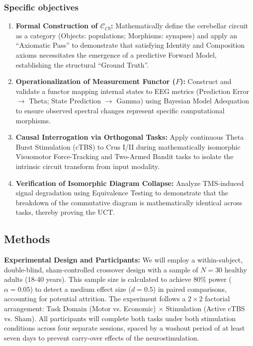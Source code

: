 \documentclass{article}
\begin{document}
	\subsubsection*{Specific objectives}
	\begin{enumerate}
		\item \textbf{Formal Construction of $\mathcal{C}_{Cb}$:} Mathematically define the cerebellar circuit as a category (Objects: populations; Morphisms: synapses) and apply an ``Axiomatic Pass'' to demonstrate that satisfying Identity and Composition axioms necessitates the emergence of a predictive Forward Model, establishing the structural ``Ground Truth''.
		
		\item \textbf{Operationalization of Measurement Functor ($F$):} Construct and validate a functor mapping internal states to EEG metrics (Prediction Error $\to$ Theta; State Prediction $\to$ Gamma) using Bayesian Model Adequation to ensure observed spectral changes represent specific computational morphisms.
		
		\item \textbf{Causal Interrogation via Orthogonal Tasks:} Apply continuous Theta Burst Stimulation (cTBS) to Crus I/II during mathematically isomorphic Visuomotor Force-Tracking and Two-Armed Bandit tasks to isolate the intrinsic circuit transform from input modality.
		
		\item \textbf{Verification of Isomorphic Diagram Collapse:} Analyze TMS-induced signal degradation using Equivalence Testing to demonstrate that the breakdown of the commutative diagram is mathematically identical across tasks, thereby proving the UCT.
	\end{enumerate}
	
	\subsection{Methods}
	
	\textbf{Experimental Design and Participants:} We will employ a within-subject, double-blind, sham-controlled crossover design with a sample of $N=30$ healthy adults (18-40 years). This sample size is calculated to achieve 80\% power ($\alpha=0.05$) to detect a medium effect size ($d=0.5$) in paired comparisons, accounting for potential attrition. The experiment follows a $2 \times 2$ factorial arrangement: Task Domain (Motor vs. Economic) $\times$ Stimulation (Active cTBS vs. Sham). All participants will complete both tasks under both stimulation conditions across four separate sessions, spaced by a washout period of at least seven days to prevent carry-over effects of the neurostimulation.
	
\end{document}

